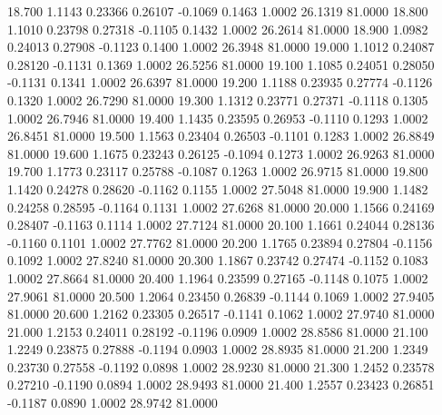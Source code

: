   18.700   1.1143   0.23366   0.26107  -0.1069   0.1463   1.0002  26.1319  81.0000
  18.800   1.1010   0.23798   0.27318  -0.1105   0.1432   1.0002  26.2614  81.0000
  18.900   1.0982   0.24013   0.27908  -0.1123   0.1400   1.0002  26.3948  81.0000
  19.000   1.1012   0.24087   0.28120  -0.1131   0.1369   1.0002  26.5256  81.0000
  19.100   1.1085   0.24051   0.28050  -0.1131   0.1341   1.0002  26.6397  81.0000
  19.200   1.1188   0.23935   0.27774  -0.1126   0.1320   1.0002  26.7290  81.0000
  19.300   1.1312   0.23771   0.27371  -0.1118   0.1305   1.0002  26.7946  81.0000
  19.400   1.1435   0.23595   0.26953  -0.1110   0.1293   1.0002  26.8451  81.0000
  19.500   1.1563   0.23404   0.26503  -0.1101   0.1283   1.0002  26.8849  81.0000
  19.600   1.1675   0.23243   0.26125  -0.1094   0.1273   1.0002  26.9263  81.0000
  19.700   1.1773   0.23117   0.25788  -0.1087   0.1263   1.0002  26.9715  81.0000
  19.800   1.1420   0.24278   0.28620  -0.1162   0.1155   1.0002  27.5048  81.0000
  19.900   1.1482   0.24258   0.28595  -0.1164   0.1131   1.0002  27.6268  81.0000
  20.000   1.1566   0.24169   0.28407  -0.1163   0.1114   1.0002  27.7124  81.0000
  20.100   1.1661   0.24044   0.28136  -0.1160   0.1101   1.0002  27.7762  81.0000
  20.200   1.1765   0.23894   0.27804  -0.1156   0.1092   1.0002  27.8240  81.0000
  20.300   1.1867   0.23742   0.27474  -0.1152   0.1083   1.0002  27.8664  81.0000
  20.400   1.1964   0.23599   0.27165  -0.1148   0.1075   1.0002  27.9061  81.0000
  20.500   1.2064   0.23450   0.26839  -0.1144   0.1069   1.0002  27.9405  81.0000
  20.600   1.2162   0.23305   0.26517  -0.1141   0.1062   1.0002  27.9740  81.0000
  21.000   1.2153   0.24011   0.28192  -0.1196   0.0909   1.0002  28.8586  81.0000
  21.100   1.2249   0.23875   0.27888  -0.1194   0.0903   1.0002  28.8935  81.0000
  21.200   1.2349   0.23730   0.27558  -0.1192   0.0898   1.0002  28.9230  81.0000
  21.300   1.2452   0.23578   0.27210  -0.1190   0.0894   1.0002  28.9493  81.0000
  21.400   1.2557   0.23423   0.26851  -0.1187   0.0890   1.0002  28.9742  81.0000
